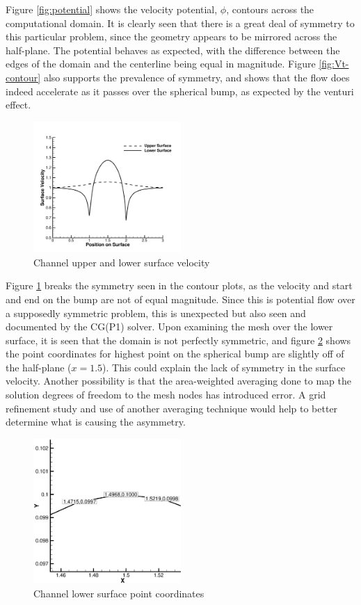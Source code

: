 \documentclass[a4paper]{article}
\begin{document}
Figure \ref{fig:potential} shows the velocity potential, $\phi$, contours across
the computational domain.  It is clearly seen that there is a great deal of
symmetry to this particular problem, since the geometry appears to be mirrored
across the half-plane.  The potential behaves as expected, with the difference
between the edges of the domain and the centerline being equal in magnitude.
Figure \ref{fig:Vt-contour} also supports the prevalence of symmetry, and shows
that the flow does indeed accelerate as it passes over the spherical bump, as
expected by the venturi effect.    
\begin{figure}[h]
  \centering
  \includegraphics[width=0.5\textwidth]{figures/surface_velocity}
  \caption{Channel upper and lower surface velocity}
  \label{fig:surface-velocity}
\end{figure}
Figure \ref{fig:surface-velocity} breaks the
symmetry seen in the contour plots, as the velocity and start and end on the
bump are not of equal magnitude.  Since this is potential flow over a supposedly
symmetric problem, this is unexpected but also seen and documented by the
CG(P1) solver. Upon examining the mesh over the lower surface, it is seen that
the domain is not perfectly symmetric, and figure \ref{fig:lower-surface} shows
the point coordinates for highest point on the spherical bump are slightly off
of the half-plane ($x=1.5$). This could explain the lack of symmetry in the surface
velocity.  Another possibility is that the area-weighted averaging done to map
the solution degrees of freedom to the mesh nodes has introduced error.  A grid
refinement study and use of another averaging technique would help to better
determine what is causing the asymmetry.
\begin{figure}[h]
  \centering
  \includegraphics[width=0.5\textwidth]{figures/lower_surface}
  \caption{Channel lower surface point coordinates}
  \label{fig:lower-surface}
\end{figure}
\end{document}
